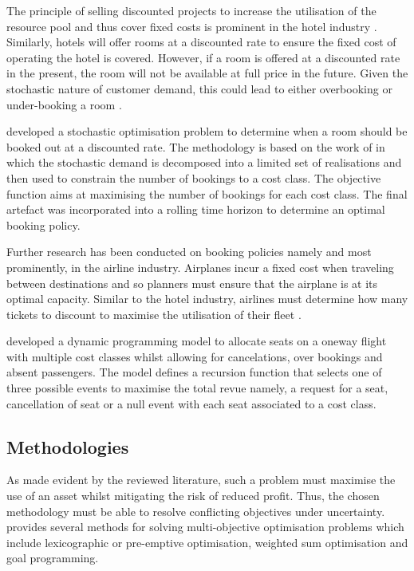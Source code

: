 \documentclass[a4paper,11pt]{article}
\begin{document}
The principle of selling discounted projects to increase the utilisation of the resource pool and thus cover fixed costs is prominent in the hotel industry \citep{badinelli2000optimal}. Similarly, hotels will offer rooms at a discounted rate to ensure the fixed cost of operating the hotel is covered. However, if a room is offered at a discounted rate in the present, the room will not be available at full price in the future. Given the stochastic nature of customer demand, this could lead to either overbooking or under-booking a room \citep{kimes1989basics}.

 \cite{schaefer2005airline} developed a stochastic optimisation problem to determine when a room should be booked out at a discounted rate. The methodology is based on the work of \cite{de1999stochastic} in which the stochastic demand is decomposed into a limited set of realisations and then used to constrain the number of bookings to a cost class. The objective function aims at maximising the number of bookings for each cost class. The final artefact was incorporated into a rolling time horizon to determine an optimal booking policy.
 
Further research has been conducted on booking policies namely and most prominently, in the airline industry. Airplanes incur a fixed cost when traveling between destinations and so planners must ensure that the airplane is at its optimal capacity. Similar to the hotel industry, airlines must determine how many tickets to discount to maximise the utilisation of their fleet \citep{smith1992yield}. 

\cite{subramanian1999airline} developed a dynamic programming model to allocate seats on a oneway flight with multiple cost classes whilst allowing for cancelations, over bookings and absent passengers. The model defines a recursion function that selects one of three possible events to maximise the total revue namely, a request for a seat, cancellation of seat or a null event with each seat associated to a cost class. 

\subsection{Methodologies}
As made evident by the reviewed literature, such a problem must maximise the use of an asset whilst mitigating the risk of reduced profit. Thus, the chosen methodology must be able to resolve conflicting objectives under uncertainty. \cite{rardin1998optimization} provides several methods for solving multi-objective optimisation problems which include lexicographic or pre-emptive optimisation, weighted sum optimisation and goal programming.
\end{document}

